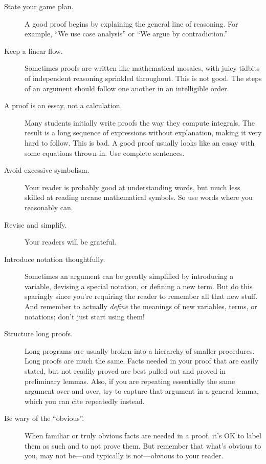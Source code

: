 \begin{description}

\item[State your game plan.]  A good proof begins by explaining the
  general line of reasoning. For example, ``We use case analysis'' or ``We
  argue by contradiction.''

\item[Keep a linear flow.]  Sometimes proofs are written like mathematical
  mosaics, with juicy tidbits of independent reasoning sprinkled
  throughout.  This is not good.  The steps of an argument should follow
  one another in an intelligible order.

\item[A proof is an essay, not a calculation.]  Many students initially
  write proofs the way they compute integrals.  The result is a long
  sequence of expressions without explanation, making it very hard to
  follow.  This is bad.  A good proof usually looks like an essay with
  some equations thrown in.  Use complete sentences.

\item[Avoid excessive symbolism.]  Your reader is probably good at
understanding words, but much less skilled at reading arcane
mathematical symbols.  So use words where you reasonably can.

\item[Revise and simplify.]  Your readers will be grateful.

\item[Introduce notation thoughtfully.]  Sometimes an argument can be
greatly simplified by introducing a variable, devising a special
notation, or defining a new term.  But do this sparingly since you're
requiring the reader to remember all that new stuff.  And remember to
actually \textit{define} the meanings of new variables, terms, or
notations; don't just start using them!

\item[Structure long proofs.]  Long programs are usually broken into a
hierarchy of smaller procedures.  Long proofs are much the same.
Facts needed in your proof that are easily stated, but not readily
proved are best pulled out and proved in preliminary lemmas.  Also, if
you are repeating essentially the same argument over and over, try to
capture that argument in a general lemma, which you can cite
repeatedly instead.

\item[Be wary of the ``obvious''.]  When familiar or truly obvious facts
  are needed in a proof, it's OK to label them as such and to not prove
  them.  But remember that what's obvious to you, may not be---and
  typically is not---obvious to your reader.


\end{description}
